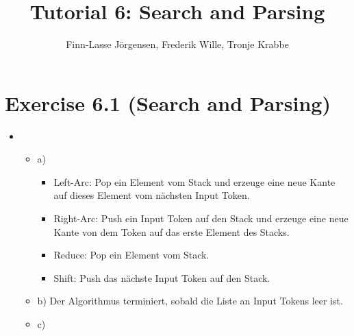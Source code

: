 \documentclass[12pt,a4paper]{article}
\author{Finn-Lasse Jörgensen, Frederik Wille, Tronje Krabbe}
\title{Tutorial 6: Search and Parsing}
\begin{document}
\maketitle


\section*{Exercise 6.1 (Search and Parsing)}
\begin{itemize}
\item
\begin{itemize}
\item{a)}
\begin{itemize}
\item Left-Arc: Pop ein Element vom Stack und erzeuge eine neue Kante auf dieses Element vom nächsten Input Token.
\item Right-Arc: Push ein Input Token auf den Stack und erzeuge eine neue Kante von dem Token auf das erste Element des Stacks.
\item Reduce: Pop ein Element vom Stack.
\item Shift: Push das nächste Input Token auf den Stack.
\end{itemize}
\item{b)}
Der Algorithmus terminiert, sobald die Liste an Input Tokens leer ist.
\item{c)}
\end{itemize}
\end{itemize}
\end{document}

